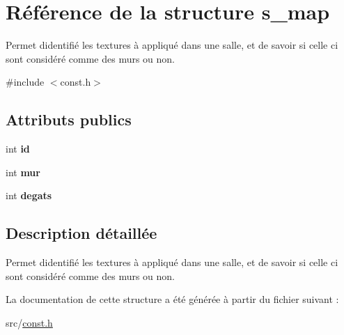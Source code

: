 \hypertarget{structs__map}{}\section{Référence de la structure s\+\_\+map}
\label{structs__map}


Permet d\textquotesingle{}identifié les textures à appliqué dans une salle, et de savoir si celle ci sont considéré comme des murs ou non.  




{\ttfamily \#include $<$const.\+h$>$}

\subsection*{Attributs publics}
\begin{DoxyCompactItemize}
\item 
\mbox{\label{structs__map_a4c920de2daf16863ab57bd7baaca40fc}} 
int {\bfseries id}
\item 
\mbox{\label{structs__map_a6f210e02dbadd8d73b1b0babb7273d5b}} 
int {\bfseries mur}
\item 
\mbox{\label{structs__map_a58a211f179c3f274591867617f8afb9c}} 
int {\bfseries degats}
\end{DoxyCompactItemize}


\subsection{Description détaillée}
Permet d\textquotesingle{}identifié les textures à appliqué dans une salle, et de savoir si celle ci sont considéré comme des murs ou non. 

La documentation de cette structure a été générée à partir du fichier suivant \+:\begin{DoxyCompactItemize}
\item 
src/\hyperlink{const_8h}{const.\+h}\end{DoxyCompactItemize}
